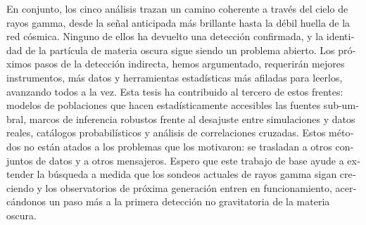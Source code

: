 \begin{otherlanguage}{spanish}
En conjunto, los cinco análisis trazan un camino coherente a través del cielo de rayos gamma, desde la señal anticipada más brillante hasta la débil huella de la red cósmica. Ninguno de ellos ha devuelto una detección confirmada, y la identidad de la partícula de materia oscura sigue siendo un problema abierto. Los próximos pasos de la detección indirecta, hemos argumentado, requerirán mejores instrumentos, más datos y herramientas estadísticas más afiladas para leerlos, avanzando todos a la vez. Esta tesis ha contribuido al tercero de estos frentes: modelos de poblaciones que hacen estadísticamente accesibles las fuentes sub-umbral, marcos de inferencia robustos frente al desajuste entre simulaciones y datos reales, catálogos probabilísticos y análisis de correlaciones cruzadas. Estos métodos no están atados a los problemas que los motivaron: se trasladan a otros conjuntos de datos y a otros mensajeros. Espero que este trabajo de base ayude a extender la búsqueda a medida que los sondeos actuales de rayos gamma sigan creciendo y los observatorios de próxima generación entren en funcionamiento, acercándonos un paso más a la primera detección no gravitatoria de la materia oscura.
\end{otherlanguage}
